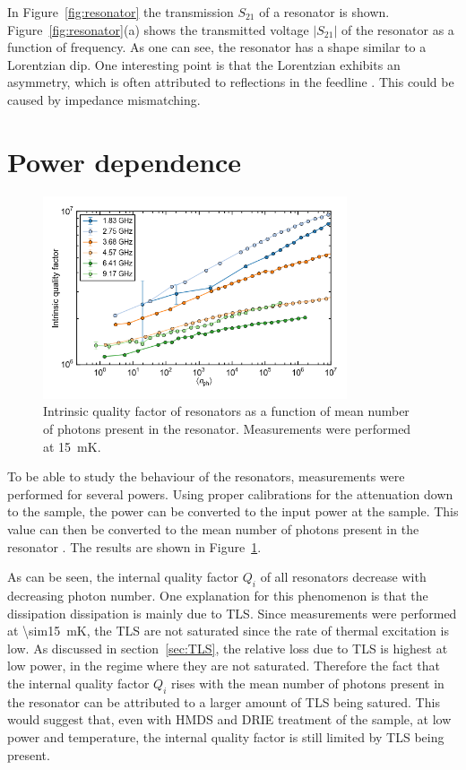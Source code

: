  In Figure~\ref{fig:resonator} the transmission $S_{21}$ of a resonator is shown. Figure~\ref{fig:resonator}(a) shows the transmitted voltage $|S_{21}|$ of the resonator as a function of frequency. As one can see, the resonator has a shape similar to a Lorentzian dip. One interesting point is that the Lorentzian exhibits an asymmetry, which is often attributed to reflections in the feedline \cite[p192]{Geerlings}. This could be caused by impedance mismatching.


\section{Power dependence}
\label{sec:resonator:results:power_dependence}

\begin{figure}
    \centering
    \includegraphics[width=0.8\textwidth]{Figures/DRIE/Qi_vs_n_photon.png}
    \caption{Intrinsic quality factor of resonators as a function of mean number of photons present in the resonator. Measurements were performed at \SI{15}{\milli \kelvin}.}
    \label{fig:Qi_vs_n_photon}
\end{figure}
To be able to study the behaviour of the resonators, measurements were performed for several powers. Using proper calibrations for the attenuation down to the sample, the power can be converted to the input power at the sample. This value can then be converted to the mean number of photons present in the resonator \cite{bruno2015reducing}. The results are shown in Figure~\ref{fig:Qi_vs_n_photon}.

As can be seen, the internal quality factor $Q_i$ of all resonators decrease with decreasing photon number. One explanation for this phenomenon is that the dissipation dissipation is mainly due to TLS. Since measurements were performed at \SI{\sim15}{mK}, the TLS are not saturated since the rate of thermal excitation is low. As discussed in section~\ref{sec:TLS}, the relative loss due to TLS is highest at low power, in the regime where they are not saturated. Therefore the fact that the internal quality factor $Q_i$ rises with the mean number of photons present in the resonator can be attributed to a larger amount of TLS being satured. This would suggest that, even with HMDS and DRIE treatment of the sample, at low power and temperature, the internal quality factor is still limited by TLS being present.

